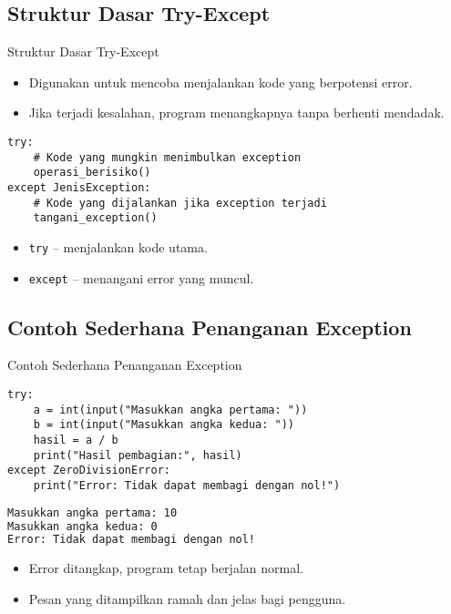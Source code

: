 \documentclass[aspectratio=169, table]{beamer}
\begin{document}
\subsection*{Struktur Dasar Try-Except}
\begin{frame}[fragile]{Struktur Dasar Try-Except}
\vspace*{20pt}
\begin{itemize}
  \item Digunakan untuk mencoba menjalankan kode yang berpotensi error.
  \item Jika terjadi kesalahan, program menangkapnya tanpa berhenti mendadak.
\end{itemize}

\begin{lstlisting}[style=PythonStyle]
try:
    # Kode yang mungkin menimbulkan exception
    operasi_berisiko()
except JenisException:
    # Kode yang dijalankan jika exception terjadi
    tangani_exception()
\end{lstlisting}

\begin{itemize}
  \item \texttt{try} – menjalankan kode utama.
  \item \texttt{except} – menangani error yang muncul.
\end{itemize}
\end{frame}

\subsection*{Contoh Sederhana Penanganan Exception}
\begin{frame}[fragile]{Contoh Sederhana Penanganan Exception}
\vspace*{20pt}
\begin{lstlisting}[style=PythonStyle]
try:
    a = int(input("Masukkan angka pertama: "))
    b = int(input("Masukkan angka kedua: "))
    hasil = a / b
    print("Hasil pembagian:", hasil)
except ZeroDivisionError:
    print("Error: Tidak dapat membagi dengan nol!")
\end{lstlisting}

\begin{lstlisting}[language=bash]
Masukkan angka pertama: 10
Masukkan angka kedua: 0
Error: Tidak dapat membagi dengan nol!
\end{lstlisting}

\begin{itemize}
  \item Error ditangkap, program tetap berjalan normal.
  \item Pesan yang ditampilkan ramah dan jelas bagi pengguna.
\end{itemize}
\end{frame}
\end{document}
